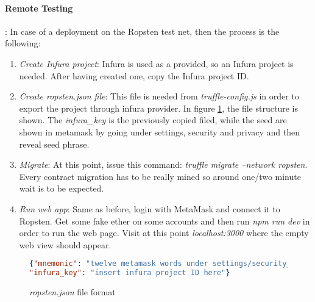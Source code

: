 \documentclass[11pt, a4paper]{report}
\begin{document}
	\paragraph*{Remote Testing}:
	In case of a deployment on the Ropsten test net, then the process is the following:
	\begin{enumerate}
		\item \emph{Create Infura project}: Infura is used as a provided, so an Infura project is needed. After having created one, copy the Infura project ID.
		\item \emph{Create ropsten.json file}: This file is needed from \emph{truffle-config.js} in order to export the project through infura provider. In figure \ref{fig:ropsten}, the file structure is shown. The \emph{infura\_key} is the previously copied filed, while the seed are shown in metamask by going under settings, security and privacy and then reveal seed phrase.
		\item \emph{Migrate}: At this point, issue this command: \emph{truffle migrate --network ropsten}. Every contract migration has to be really mined so around one/two minute wait is to be expected.
		\item \emph{Run web app}: Same as before, login with MetaMask and connect it to Ropsten. Get some fake ether on some accounts and then run \emph{npm run dev} in order to run the web page. Visit at this point \emph{localhost:3000} where the empty web view should appear.
	\end{enumerate}
	\begin{figure}
		\caption{\emph{ropsten.json} file format}
		\label{fig:ropsten}
		\begin{lstlisting}[language=json,firstnumber=1]
{"mnemonic": "twelve metamask words under settings/security_and_privacy/reveal_seed_phrase",
"infura_key": "insert infura project ID here"}
		\end{lstlisting}
	\end{figure}
	
\end{document}
